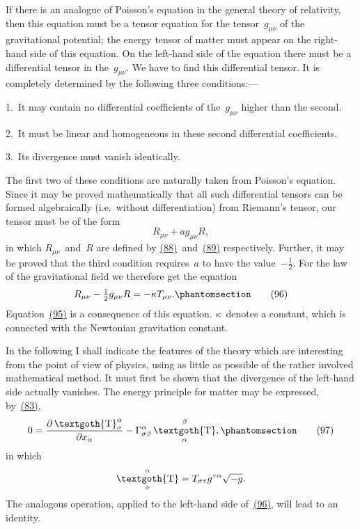 \documentclass[12pt]{book}[2005/09/16]
\newcommand{\Change}[2]{#2}
\newcommand{\Add}[1]{\Change{}{#1}}
\newcommand{\PageSep}[1]{\ignorespaces}
\newcommand{\Tag}[1]{%
  \phantomsection
  \label{eqn:#1}
  \tag*{#1}
}
\newcommand{\Eqref}[1]{\hyperref[eqn:#1]{#1}}
\newcommand{\dd}{\partial}
\newcommand{\Tensor}[1]{\textgoth{#1}}
\DeclareMathOperator{\tT}{\Tensor{T}}
\begin{document}
If there is an analogue of Poisson's equation in the
general theory of relativity, then this equation must be
a tensor equation for the tensor~$g_{\mu\nu}$ of the gravitational
potential; the energy tensor of matter must appear on
the right-hand side of this equation. On the left-hand
side of the equation there must be a differential tensor
in the~$g_{\mu\nu}$. We have to find this differential tensor.
It is completely determined by the following three
conditions:---

1.~It may contain no differential coefficients of the~$g_{\mu\nu}$
higher than the second.

2.~It must be linear and homogeneous in these second
differential coefficients.

3.~Its divergence must vanish identically.

The first two of these conditions are naturally taken
from Poisson's equation. Since it may be proved
mathematically that all such differential tensors can be
formed algebraically (i.e.~without differentiation) from
Riemann's tensor, our tensor must be of the form
\[
R_{\mu\nu} + ag_{\mu\nu} R\Add{,}
\]
in which $R_{\mu\nu}$~and~$R$ are defined by \Eqref{(88)}~and~\Eqref{(89)} respectively.
Further, it may be proved that the third condition
requires~$a$ to have the value~$-\frac{1}{2}$. For the law
\PageSep{93}
of the gravitational field we therefore get the equation
\[
R_{\mu\nu} - \tfrac{1}{2}g_{\mu\nu} R = - \kappa T_{\mu\nu}\Add{.}
\Tag{(96)}
\]
Equation~\Eqref{(95)} is a consequence of this equation. $\kappa$~denotes
a constant, which is connected with the Newtonian
gravitation constant.

In the following I shall indicate the features of the
theory which are interesting from the point of view of
physics, using as little as possible of the rather involved
mathematical method. It must first be shown that the
divergence of the left-hand side actually vanishes. The
energy principle for matter may be expressed, by~\Eqref{(83)},
\[
0 = \frac{\dd \tT_{\sigma}^{\alpha}}{\dd x_{\alpha}}
  - \Gamma_{\sigma\beta}^{\alpha} \tT_{\alpha}^{\beta}\Add{,}
\Tag{(97)}
\]
in which
\[
\tT_{\sigma}^{\alpha} = T_{\sigma\tau} g^{\tau\alpha} \sqrt{-g}.
\]
The analogous operation, applied to the left-hand side
of~\Eqref{(96)}, will lead to an identity.
\end{document}
